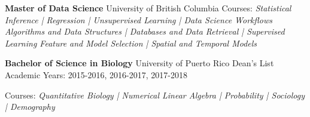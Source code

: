 %
%
%


\begin{scholarship}
					{ \textbf{Master of Data Science} \newline University of British Columbia \newline
					\newline
					Courses: \emph{Statistical Inference | Regression | Unsupervised Learning | Data Science Workflows \newline 
					Algorithms and Data Structures | Databases and Data Retrieval | Supervised Learning \newline 
					Feature and Model Selection | Spatial and Temporal Models \newline}
					}
					{ \textbf{Bachelor of Science in Biology} \newline University of Puerto Rico 
					\newline \newline
					Dean's List Academic Years: 2015-2016, 2016-2017, 2017-2018
					
					Courses: \emph{Quantitative Biology | Numerical Linear Algebra |
					Probability | Sociology | Demography }
					}
\end{scholarship}